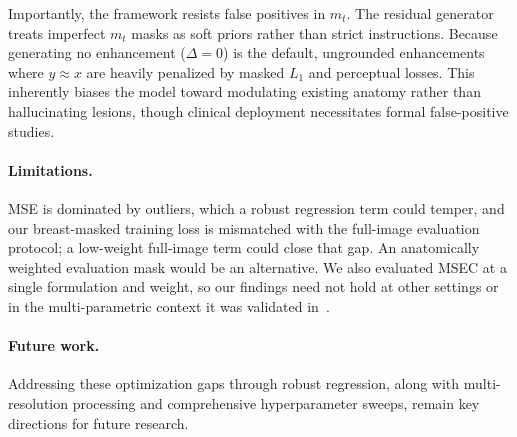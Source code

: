 \documentclass[runningheads,a4paper]{llncs}
\begin{document}
Importantly, the framework resists false positives in $m_t$. 
The residual generator treats imperfect $m_t$ masks as soft priors rather than strict instructions. Because generating no enhancement ($\Delta=0$) is the default, ungrounded enhancements where $y \approx x$ are heavily penalized by masked $L_1$ and perceptual losses. This inherently biases the model toward modulating existing anatomy rather than hallucinating lesions, though clinical deployment necessitates formal false-positive studies.

\paragraph{Limitations.}
MSE is dominated by outliers, which a robust regression term could temper, and our breast-masked training loss is mismatched with the full-image evaluation protocol; a low-weight full-image term could close that gap. An anatomically weighted evaluation mask would be an alternative. We also evaluated MSEC at a single formulation and weight, so our findings need not hold at other settings or in the multi-parametric context it was validated in~\cite{yang2026miccai}.

\paragraph{Future work.}
Addressing these optimization gaps through robust regression, along with multi-resolution processing and comprehensive hyperparameter sweeps, remain key directions for future research.



\end{document}
